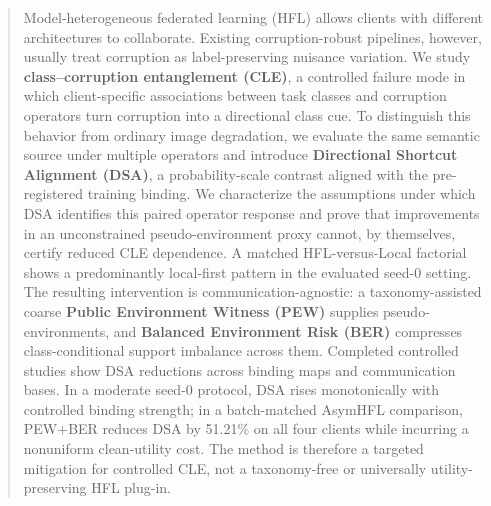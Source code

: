 \begin{abstract}

Model-heterogeneous federated learning (HFL) allows clients with different architectures to collaborate. Existing corruption-robust pipelines, however, usually treat corruption as label-preserving nuisance variation. We study \textbf{class--corruption entanglement (CLE)}, a controlled failure mode in which client-specific associations between task classes and corruption operators turn corruption into a directional class cue. To distinguish this behavior from ordinary image degradation, we evaluate the same semantic source under multiple operators and introduce \textbf{Directional Shortcut Alignment (DSA)}, a probability-scale contrast aligned with the pre-registered training binding. We characterize the assumptions under which DSA identifies this paired operator response and prove that improvements in an unconstrained pseudo-environment proxy cannot, by themselves, certify reduced CLE dependence. A matched HFL-versus-Local factorial shows a predominantly local-first pattern in the evaluated seed-0 setting. The resulting intervention is communication-agnostic: a taxonomy-assisted coarse \textbf{Public Environment Witness (PEW)} supplies pseudo-environments, and \textbf{Balanced Environment Risk (BER)} compresses class-conditional support imbalance across them. Completed controlled studies show DSA reductions across binding maps and communication bases. In a moderate seed-0 protocol, DSA rises monotonically with controlled binding strength; in a batch-matched AsymHFL comparison, PEW+BER reduces DSA by 51.21\% on all four clients while incurring a nonuniform clean-utility cost. The method is therefore a targeted mitigation for controlled CLE, not a taxonomy-free or universally utility-preserving HFL plug-in.
\ifdraftskeleton
{}
\fi

\end{abstract}

